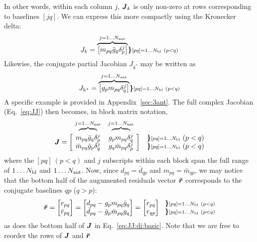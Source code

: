 \documentclass[useAMS,usenatbib]{mn2e}
\makeatletter
\newcommand{\mat}[1]{{\bmath{#1}}}
\newcommand{\JJ}{\mat{J}} %
\newcommand{\Matrix}[2]{\left [ \begin{array}{@{}#1@{}}#2\end{array} \right ]}
\newcommand{\Stack}[1]{\begin{array}{@{}c@{}}#1\end{array}}
\newcommand{\AUG}[1]{\bmath{\breve{#1}}}
\newcommand{\Rr}{\AUG{r}}
\numberwithin{equation}{section}
\makeatother
\begin{document}
In other words, within each column $j$, $\JJ_k$ is only non-zero at rows corresponding to baselines $[jq]$. We can express 
this more compactly using the Kronecker delta:
\begin{equation}
\label{eq:Jk}
J_k = \overbrace{ \Matrix{c}{ m_{pq}\bar{g}_q\delta^{j}_p } } ^{j=1\dots \Na} \bm{ \}} {\scriptstyle [pq]=1\dots \Nbl~(p<q)}
\end{equation}
Likewise, the conjugate partial Jacobian $J_{k^*}$ may be written as
\begin{equation}
\label{eq:Jbark}
J_{k^*} = \overbrace{ \Matrix{c}{ g_p m_{pq} \delta^{j}_q } } ^{j=1\dots \Na} \bm{ \}} {\scriptstyle [pq]=1\dots \Nbl~(p<q)}
\end{equation}
A specific example is provided in Appendix~\ref{sec:3ant}. The full complex Jacobian (Eq.~\ref{eq:JJ}) then 
becomes, in block matrix notation,
\begin{equation}
\label{eq:JJ:di:basic}
\begin{array}{r@{~}cc@{~}cc}
                & \overbrace{~~~~~~~~}^{j=1\dots \Na} & \overbrace{~~~~~~~~}^{j=1\dots \Na} \\
\JJ = \bigg [ &
  \Stack{ m_{pq}\bar{g}_q\delta^{j}_p \\ \bar{m}_{pq} \bar{g}_p \delta^{j}_q } &
  \Stack{ g_p m_{pq} \delta^{j}_q \\ g_q \bar{m}_{pq} \delta^{j}_p }  
& \bigg ] &
\Stack{ \bm{\}} {\scriptstyle [pq]=1\dots \Nbl}~(p<q) \\ \bm{\}} {\scriptstyle [pq]=1\dots \Nbl}~(p<q) }
\end{array}
\end{equation}
where the $[pq]~(p<q)$ and $j$ subscripts within each block span the full range of $1\dots N_\mathrm{bl}$ and 
$1\dots N_\mathrm{ant}$. Now, since $d_{pq} = \bar{d}_{qp}$ and $m_{pq} = \bar{m}_{qp}$, we may notice
that the bottom half of the augumented residuals vector $\Rr$ corresponds to the conjugate baselines 
$qp$ ($q>p$):
\begin{equation}
\Rr = \Matrix{c}{ r_{pq} \\ \bar{r}_{pq} } = \Matrix{c}{d_{pq}-g_p m_{pq}\bar{g}_q\\ \bar{d}_{pq}-\bar{g}_p \bar{m}_{pq}g_q} = 
\Matrix{c}{ r_{pq} \\ r_{qp} }~~ 
\Stack{ \bm{\}} \scriptstyle [pq]=1\dots \Nbl~(p<q) \\ \bm{\}} \scriptstyle [pq]=1\dots \Nbl~(p<q) }
\end{equation}
as does the bottom half of $\JJ$ in Eq.~\ref{eq:JJ:di:basic}. Note that we are free to reorder the rows of $\JJ$ and $\Rr$ 
\end{document}
